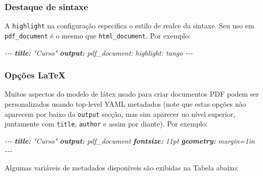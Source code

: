 \documentclass[
]{book}
\newenvironment{Shaded}{\begin{snugshade}}{\end{snugshade}}
\newcommand{\AnnotationTok}[1]{\textcolor[rgb]{0.56,0.35,0.01}{\textbf{\textit{#1}}}}
\newcommand{\CommentTok}[1]{\textcolor[rgb]{0.56,0.35,0.01}{\textit{#1}}}
\begin{document}
\hypertarget{destaque-de-sintaxe}{%
\subsubsection{Destaque de sintaxe}\label{destaque-de-sintaxe}}

A \texttt{highlight} na configuração especifica o estilo de realce da sintaxe. Seu uso em \texttt{pdf\_document} é o mesmo que \texttt{html\_document}. Por exemplo:

\begin{Shaded}
\begin{Highlighting}[]
\CommentTok{{-}{-}{-}}
\AnnotationTok{title:}\CommentTok{ "Curso"}
\AnnotationTok{output:}
\CommentTok{  pdf\_document:}
\CommentTok{    highlight: tango}
\CommentTok{{-}{-}{-}}
\end{Highlighting}
\end{Shaded}

\hypertarget{opuxe7uxf5es-latex}{%
\subsubsection{Opções LaTeX}\label{opuxe7uxf5es-latex}}

Muitos aspectos do modelo de látex usado para criar documentos PDF podem ser personalizados usando top-level YAML metadados (note que estas opções não aparecem por baixo da \texttt{output} secção, mas sim aparecer no nível superior, juntamente com \texttt{title}, \texttt{author} e assim por diante). Por exemplo:

\begin{Shaded}
\begin{Highlighting}[]
\CommentTok{{-}{-}{-}}
\AnnotationTok{title:}\CommentTok{ "Curso"}
\AnnotationTok{output:}\CommentTok{ pdf\_document}
\AnnotationTok{fontsize:}\CommentTok{ 11pt}
\AnnotationTok{geometry:}\CommentTok{ margin=1in}
\CommentTok{{-}{-}{-}}
\end{Highlighting}
\end{Shaded}

Algumas variáveis de metadados disponíveis são exibidas na Tabela abaixo:
\end{document}
